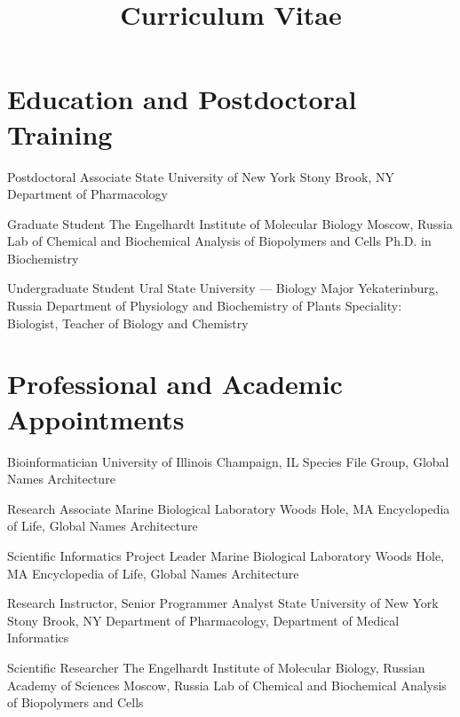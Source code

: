 \documentclass[11pt,letterpaper,sans]{moderncv} %
\title{Curriculum Vitae}
\begin{document}
\makecvtitle %


\section{Education and Postdoctoral Training}

{Postdoctoral Associate}
{State University of New York}
{Stony Brook, NY}
{Department of Pharmacology}
{}

{Graduate Student}
{The Engelhardt Institute of Molecular Biology}
{Moscow, Russia}
{Lab of Chemical and Biochemical Analysis of Biopolymers and Cells}
{Ph.D. in Biochemistry}

 {Undergraduate Student}
 {Ural State University --- Biology Major}
 {Yekaterinburg, Russia}
 {Department of Physiology and Biochemistry of Plants}
 {Speciality: Biologist, Teacher of Biology and Chemistry}



\section{Professional and Academic Appointments}

{Bioinformatician}
{University of Illinois}
{Champaign, IL}
{Species File Group, Global Names Architecture}
{}

{Research Associate}
{Marine Biological Laboratory}
{Woods Hole, MA}
{Encyclopedia of Life, Global Names Architecture}
{}

{Scientific Informatics Project Leader}
{Marine Biological Laboratory}
{Woods Hole, MA}
{Encyclopedia of Life, Global Names Architecture}
{}

{Research Instructor, Senior Programmer Analyst}
{State University of New York}
{Stony Brook, NY}
{Department of Pharmacology, Department of Medical Informatics}
{}

{Scientific Researcher}
{The Engelhardt Institute of Molecular Biology,
   Russian Academy of  Sciences}
{Moscow, Russia}
{Lab of Chemical and Biochemical Analysis of Biopolymers and Cells}
{}
\end{document}
